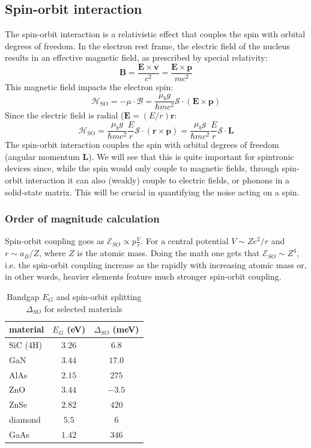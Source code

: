 \documentclass[a4paper,11pt]{article}
\begin{document}
\subsection {Spin-orbit interaction}
The spin-orbit interaction is a relativistic effect that couples the spin with orbital degrees of freedom.
\newline In the electron rest frame, the electric field of the nucleus results in an effective magnetic field, as prescribed by special relativity:
\begin{equation}
    \mathbf{B} = \frac{\mathbf{E} \times \mathbf{v}}{c^2} = \frac{\mathbf{E} \times \mathbf{p}}{mc^2}
\end{equation}
This magnetic field impacts the electron spin:
\begin{equation}
    \mathcal{H}_{\mbox{SO}} = - \mathcal{\mu} \cdot \mathcal{B} = \frac{\mu_b g}{\hbar m c^2} \mathcal{S} \cdot \left( \mathbf{E} \times \mathbf{p} \right)
\end{equation}
Since the electric field is radial ($\mathbf{E} = (E/r)\mathbf{r}$:
\begin{equation}
    \mathcal{H}_{\mbox{SO}} =  \frac{\mu_b g}{\hbar m c^2} \frac{E}{r} \mathcal{S} \cdot \left( \mathbf{r} \times \mathbf{p} \right) = \frac{\mu_b g}{\hbar m c^2} \frac{E}{r} \mathcal{S} \cdot \mathbf{L}
\end{equation}
The spin-orbit interaction couples the spin with orbital degrees of freedom (angular momentum $\mathbf{L}$). We will see that this is quite important for spintronic devices since, while the spin would only couple to magnetic fields, through spin-orbit interaction it can also (weakly) couple to electric fields, or phonons in a solid-state matrix. This will be crucial in quantifying the noise acting on a spin.
\subsubsection {Order of magnitude calculation}
Spin-orbit coupling goes as $\mathcal{E}_{SO} \propto p\frac{V}{r}$. For a central potential $V \sim Ze^2/r$ and $r \sim a_B/Z$, where $Z$ is the atomic mass. Doing the math one gets that $\mathcal{E}_{SO} \sim Z^4$, i.e. the spin-orbit coupling increase as the rapidly with increasing atomic mass or, in other words, heavier elements feature much stronger spin-orbit coupling.


\begin{table}[h]
\centering
\begin{tabular}{l | c | c }
material & $E_G$ (eV) & $\Delta_{SO}$ (meV)\\
\hline
SiC (4H) & $3.26$ & $6.8$  \\
GaN & $3.44$ & $17.0$  \\
AlAs & $2.15$ & $275$  \\
ZnO & $3.44$ & $-3.5$   \\
ZnSe & $2.82$ & $420$  \\
diamond & $5.5$ & $6$  \\
GaAs & $1.42$ & $346$  
\end{tabular}
\caption{Bandgap $E_G$ and spin-orbit splitting $\Delta_{SO}$ for selected materials}
\label{tab:SO}
\end{table}
\end{document}
